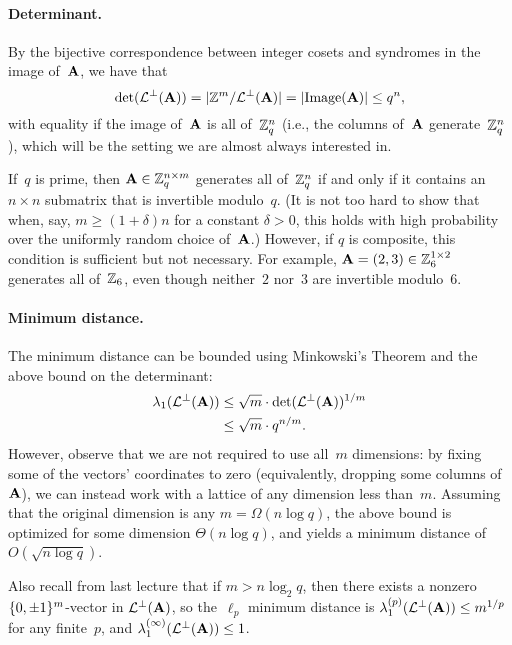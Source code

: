 \documentclass[11pt]{article}
\begin{document}
\paragraph{Determinant.}

By the bijective correspondence between integer cosets and syndromes
in the image of~$\mathbf{A}$, we have that
\[ \det(\mathcal{L}^{\perp}(\mathbf{A})) = \lvert\mathbb{Z}^m / \mathcal{L}^{\perp}(\mathbf{A})\rvert =
  \lvert\text{Image}(\mathbf{A})\rvert \leq q^{n} , \] with equality if the image
of~$\mathbf{A}$ is all of~$\mathbb{Z}_q^{n}$ (i.e., the columns of~$\mathbf{A}$
generate~$\mathbb{Z}_q^{n}$), which will be the setting we are almost always
interested in.

If~$q$ is prime, then $\mathbf{A} \in \mathbb{Z}_q^{n \times m}$ generates all
of~$\mathbb{Z}_q^n$ if and only if it contains an $n \times n$ submatrix that
is invertible modulo~$q$. (It is not too hard to show that when, say,
$m \geq (1+\delta)n$ for a constant $\delta > 0$, this holds with high
probability over the uniformly random choice of~$\mathbf{A}$.) However, if
$q$ is composite, this condition is sufficient but not necessary. For
example, $\mathbf{A}=(2, 3) \in \mathbb{Z}_6^{1 \times 2}$ generates all of~$\mathbb{Z}_6$,
even though neither~$2$ nor~$3$ are invertible modulo~$6$.

\paragraph{Minimum distance.}

The minimum distance can be bounded using Minkowski's Theorem and the
above bound on the determinant:
\begin{align*}
  \lambda_1(\mathcal{L}^{\perp}(\mathbf{A}))
  &\leq \sqrt{m} \cdot \det(\mathcal{L}^{\perp}(\mathbf{A}))^{1/m} \\
  &\leq \sqrt{m} \cdot q^{n/m} .
\end{align*}
However, observe that we are not required to use all~$m$ dimensions:
by fixing some of the vectors' coordinates to zero (equivalently,
dropping some columns of~$\mathbf{A}$), we can instead work with a lattice
of any dimension less than~$m$. Assuming that the original dimension
is any $m = \Omega(n \log q)$, the above bound is optimized for some
dimension $\Theta(n \log q)$, and yields a minimum distance of
$O(\sqrt{n \log q})$.

Also recall from last lecture that if $m > n \log_{2} q$, then there
exists a nonzero $\{0,\pm 1\}^{m}$-vector in $\mathcal{L}^{\perp}(\mathbf{A})$, so
the~$\ell_{p}$ minimum distance is
$\lambda_{1}^{(p)}(\mathcal{L}^{\perp}(\mathbf{A})) \leq m^{1/p}$ for any finite~$p$,
and $\lambda_{1}^{(\infty)}(\mathcal{L}^{\perp}(\mathbf{A})) \leq 1$.
\end{document}
